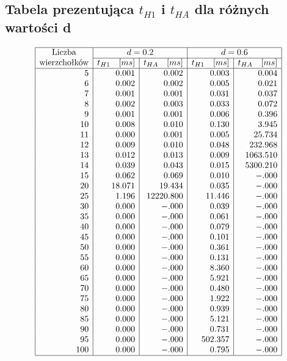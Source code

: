 \documentclass[polish,polish,a4paper]{article}
\begin{document}
\begin{spacing}{1.25}
\begin{spacing}{1.3}
	{\centering \subsection*{Tabela prezentująca $t_{H1}$ i $t_{HA}$ dla różnych wartości d}}
	\begin{equation*}
	\begin{array}{|r|r|r|r|r|}
	\hline
	\multicolumn{1}{|c|}{$Liczba$}&
	\multicolumn{2}{c|}{d = 0.2}&
	\multicolumn{2}{c|}{d = 0.6}\\\cline{2-5}
	\multicolumn{1}{|c|}{$wierzchołków$}&
	\multicolumn{1}{c|}{t_{H1} \quad [ms]}&
	\multicolumn{1}{c|}{t_{HA} \quad [ms]}&
	\multicolumn{1}{c|}{t_{H1} \quad [ms]}&
	\multicolumn{1}{c|}{t_{HA} \quad [ms]}\\
	\hline
5&0.001&0.002&0.003&0.004\\
6&0.002&0.002&0.005&0.021\\
7&0.001&0.001&0.031&0.037\\
8&0.002&0.003&0.033&0.072\\
9&0.001&0.001&0.006&0.396\\
10&0.008&0.010&0.130&3.945\\
11&0.000&0.001&0.005&25.734\\
12&0.009&0.010&0.048&232.968\\
13&0.012&0.013&0.009&1063.510\\
14&0.039&0.043&0.015&5300.210\\
15&0.062&0.069&0.010&-.000\\
20&18.071&19.434&0.035&-.000\\
25&1.196&12220.800&11.446&-.000\\
30&0.000&-.000&0.039&-.000\\
35&0.000&-.000&0.061&-.000\\
40&0.000&-.000&0.079&-.000\\
45&0.000&-.000&0.101&-.000\\
50&0.000&-.000&0.361&-.000\\
55&0.000&-.000&0.131&-.000\\
60&0.000&-.000&8.360&-.000\\
65&0.000&-.000&5.921&-.000\\
70&0.000&-.000&0.480&-.000\\
75&0.000&-.000&1.922&-.000\\
80&0.000&-.000&0.939&-.000\\
85&0.000&-.000&5.121&-.000\\
90&0.000&-.000&0.731&-.000\\
95&0.000&-.000&502.357&-.000\\
100&0.000&-.000&0.795&-.000\\
\hline
	\end{array}
	\end{equation*}
\end{spacing}



\end{spacing}
\end{document}
